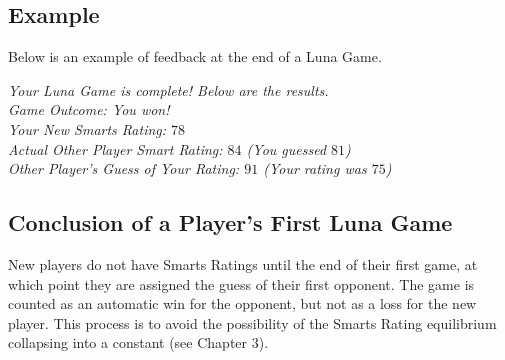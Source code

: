 \subsection{Example}
Below is an example of feedback at the end of a Luna Game.
\begin{center}
\textit{Your Luna Game is complete! Below are the results.}\\
\textit{Game Outcome: You won!}\\
\textit{Your New Smarts Rating: $78$}\\
\textit{Actual Other Player Smart Rating: $84$ (You guessed $81$)}\\
\textit{Other Player's Guess of Your Rating: $91$ (Your rating was $75$)}
\end{center}

\subsection{Conclusion of a Player's First Luna Game}

New players do not have Smarts Ratings until the end of their first game, at which point they are assigned the guess of their first opponent. The game is counted as an automatic win for the opponent, but not as a loss for the new player. This process is to avoid the possibility of the Smarts Rating equilibrium collapsing into a constant (see Chapter $3$).